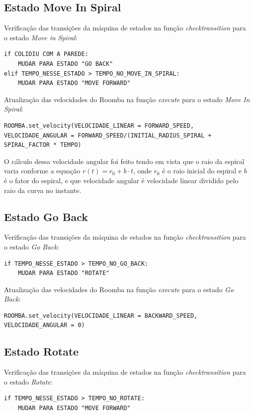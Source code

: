 \documentclass[conference]{IEEEtran}
\begin{document}
\subsection{Estado Move In Spiral}
Verificação das transições da máquina de estados na função \textit{check\underline{\space}transition} para o estado \textit{Move in Spiral}:
\begin{lstlisting}
if COLIDIU COM A PAREDE:
	MUDAR PARA ESTADO "GO BACK"
elif TEMPO_NESSE_ESTADO > TEMPO_NO_MOVE_IN_SPIRAL:
	MUDAR PARA ESTADO "MOVE FORWARD"
\end{lstlisting}

Atualização das velocidades do Roomba na função \textit{execute} para o estado \textit{Move In Spiral}:
\begin{lstlisting}
ROOMBA.set_velocity(VELOCIDADE_LINEAR = FORWARD_SPEED, VELOCIDADE_ANGULAR = FORWARD_SPEED/(INITIAL_RADIUS_SPIRAL + SPIRAL_FACTOR * TEMPO)
\end{lstlisting}

O cálculo dessa velocidade angular foi feito tendo em vista que o raio da espiral varia conforme a equação $r(t) = r_0 + b \cdot t$, onde $r_0$ é o raio inicial do espiral e $b$ é o fator do espiral, e que velocidade angular é velocidade linear dividido pelo raio da curva no instante.

\subsection{Estado Go Back}
Verificação das transições da máquina de estados na função \textit{check\underline{\space}transition} para o estado \textit{Go Back}:
\begin{lstlisting}
if TEMPO_NESSE_ESTADO > TEMPO_NO_GO_BACK:
	MUDAR PARA ESTADO "ROTATE"
\end{lstlisting}

Atualização das velocidades do Roomba na função \textit{execute} para o estado \textit{Go Back}:
\begin{lstlisting}
ROOMBA.set_velocity(VELOCIDADE_LINEAR = BACKWARD_SPEED, VELOCIDADE_ANGULAR = 0)
\end{lstlisting}

\subsection{Estado Rotate}
Verificação das transições da máquina de estados na função \textit{check\underline{\space}transition} para o estado \textit{Rotate}:
\begin{lstlisting}
if TEMPO_NESSE_ESTADO > TEMPO_NO_ROTATE:
	MUDAR PARA ESTADO "MOVE FORWARD"
\end{lstlisting}
\end{document}
